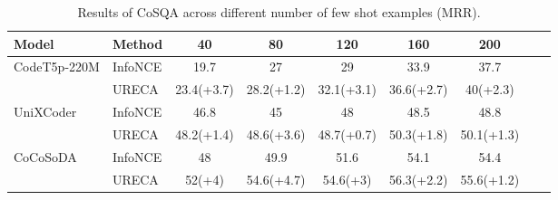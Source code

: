 \begin{table*}[h]
\def\arraystretch{1.0}
\setlength\tabcolsep{8pt} %
\begin{tabular}{@{}lllcccccc@{}}

\toprule
Model                            & \multicolumn{1}{l}{Method}              & \multicolumn{1}{c}{40}           
& \multicolumn{1}{c}{80}         & \multicolumn{1}{c}{120}               & \multicolumn{1}{c}{160}     
& \multicolumn{1}{c}{200}        \\ \midrule

\multirow{2}{*}{CodeT5p-220M}      
& InfoNCE                   & \multicolumn{1}{c}{19.7}          & \multicolumn{1}{c}{27}          
                            & \multicolumn{1}{c}{29}          & \multicolumn{1}{c}{33.9}          
                            & \multicolumn{1}{c}{37.7}                  
                            \\ \cmidrule(l){2-7} 
& URECA                     & \multicolumn{1}{c}{23.4(+3.7)}          & \multicolumn{1}{c}{28.2(+1.2)}          
                            & \multicolumn{1}{c}{32.1(+3.1)}          & \multicolumn{1}{c}{36.6(+2.7)}          
                            & \multicolumn{1}{c}{40(+2.3)}                   
                            \\ \midrule

\multirow{2}{*}{UniXCoder} 
& InfoNCE                   & \multicolumn{1}{c}{46.8}          & \multicolumn{1}{c}{45}          
                            & \multicolumn{1}{c}{48}          & \multicolumn{1}{c}{48.5}          
                            & \multicolumn{1}{c}{48.8}                   
                            \\ \cmidrule(l){2-7} 
& URECA                     & \multicolumn{1}{c}{48.2(+1.4)}          & \multicolumn{1}{c}{48.6(+3.6)}          
                            & \multicolumn{1}{c}{48.7(+0.7)}          & \multicolumn{1}{c}{50.3(+1.8)}          
                            & \multicolumn{1}{c}{50.1(+1.3)}                  
                            \\ \midrule

\multirow{2}{*}{CoCoSoDA} 
& InfoNCE                   & \multicolumn{1}{c}{48}          & \multicolumn{1}{c}{49.9}          
                            & \multicolumn{1}{c}{51.6}          & \multicolumn{1}{c}{54.1}          
                            & \multicolumn{1}{c}{54.4}                   
                            \\ \cmidrule(l){2-7} 
& URECA                     & \multicolumn{1}{c}{52(+4)}          & \multicolumn{1}{c}{54.6(+4.7)}          
                            & \multicolumn{1}{c}{54.6(+3)}          & \multicolumn{1}{c}{56.3(+2.2)}          
                            & \multicolumn{1}{c}{55.6(+1.2)}                                  
                            \\ \bottomrule 
\end{tabular}
\caption{Results of CoSQA across different number of few shot examples (MRR).}
\label{CoSQA}
\end{table*}

